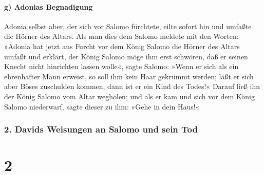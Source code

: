 \hypertarget{g-adonias-begnadigung}{%
\paragraph{g) Adonias Begnadigung}\label{g-adonias-begnadigung}}

Adonia selbst aber, der sich vor Salomo fürchtete, eilte
sofort hin und umfaßte die Hörner des Altars. Als man
dies dem Salomo meldete mit den Worten: »Adonia hat jetzt aus Furcht vor
dem König Salomo die Hörner des Altars umfaßt und erklärt, der König
Salomo möge ihm erst schwören, daß er seinen Knecht nicht hinrichten
lassen wolle«, sagte Salomo: »Wenn er sich als ein
ehrenhafter Mann erweist, so soll ihm kein Haar gekrümmt werden; läßt er
sich aber Böses zuschulden kommen, dann ist er ein Kind des Todes!«
Darauf ließ ihn der König Salomo vom Altar wegholen; und
als er kam und sich vor dem König Salomo niederwarf, sagte dieser zu
ihm: »Gehe in dein Haus!«

\hypertarget{davids-weisungen-an-salomo-und-sein-tod}{%
\subsubsection{2. Davids Weisungen an Salomo und sein
Tod}\label{davids-weisungen-an-salomo-und-sein-tod}}

\hypertarget{section-1}{%
\section{2}\label{section-1}}

